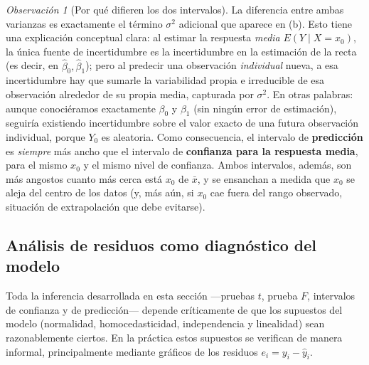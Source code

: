 \documentclass[11pt,a4paper]{article}
\theoremstyle{plain}
\theoremstyle{definition}
\theoremstyle{remark}
\newtheorem{observacion}[teorema]{Observación}
\begin{document}
\begin{observacion}[Por qué difieren los dos intervalos]
La diferencia entre ambas varianzas es exactamente el término $\sigma^2$ adicional que aparece en (b). Esto tiene una explicación conceptual clara: al estimar la respuesta \emph{media} $E(Y\mid X=x_0)$, la única fuente de incertidumbre es la incertidumbre en la estimación de la recta (es decir, en $\hat\beta_0,\hat\beta_1$); pero al predecir una observación \emph{individual} nueva, a esa incertidumbre hay que sumarle la variabilidad propia e irreducible de esa observación alrededor de su propia media, capturada por $\sigma^2$. En otras palabras: aunque conociéramos exactamente $\beta_0$ y $\beta_1$ (sin ningún error de estimación), seguiría existiendo incertidumbre sobre el valor exacto de una futura observación individual, porque $Y_0$ es aleatoria. Como consecuencia, el intervalo de \textbf{predicción} es \emph{siempre} más ancho que el intervalo de \textbf{confianza para la respuesta media}, para el mismo $x_0$ y el mismo nivel de confianza. Ambos intervalos, además, son más angostos cuanto más cerca está $x_0$ de $\bar x$, y se ensanchan a medida que $x_0$ se aleja del centro de los datos (y, más aún, si $x_0$ cae fuera del rango observado, situación de extrapolación que debe evitarse).
\end{observacion}

\subsection{Análisis de residuos como diagnóstico del modelo}

Toda la inferencia desarrollada en esta sección —pruebas $t$, prueba $F$, intervalos de confianza y de predicción— depende críticamente de que los supuestos del modelo (normalidad, homocedasticidad, independencia y linealidad) sean razonablemente ciertos. En la práctica estos supuestos se verifican de manera informal, principalmente mediante gráficos de los residuos $e_i=y_i-\hat y_i$.
\end{document}
